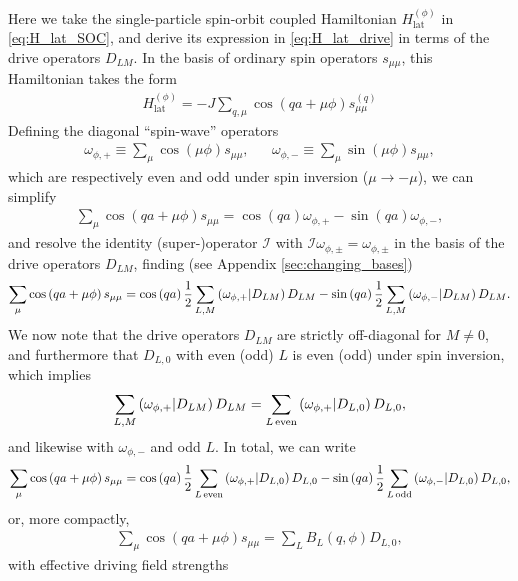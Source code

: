 \documentclass[nofootinbib,notitlepage,11pt]{revtex4-2}
\renewcommand{\t}{\text} %
\newcommand{\f}[2]{\dfrac{#1}{#2}} %
\newcommand{\p}[1]{\left(#1\right)} %
\newcommand{\1}{\mathds{1}}
\newcommand{\I}{\mathcal{I}}
\def\obk#1{\mathinner{({#1})}}
\begin{document}
Here we take the single-particle spin-orbit coupled Hamiltonian
$H_{\t{lat}}^{(\phi)}$ in \eqref{eq:H_lat_SOC}, and derive its
expression in \eqref{eq:H_lat_drive} in terms of the drive operators
$D_{LM}$.  In the basis of ordinary spin operators $s_{\mu\mu}$, this
Hamiltonian takes the form
\begin{align}
  H_{\t{lat}}^{(\phi)}
  = -J \sum_{q,\mu} \cos\p{qa+\mu\phi} s_{\mu\mu}^{(q)}
  \label{eq:H_lat_spin}
\end{align}
Defining the diagonal ``spin-wave'' operators
\begin{align}
  \omega_{\phi,+} \equiv \sum_\mu \cos\p{\mu\phi} s_{\mu\mu},
  &&
  \omega_{\phi,-} \equiv \sum_\mu \sin\p{\mu\phi} s_{\mu\mu},
\end{align}
which are respectively even and odd under spin inversion
($\mu\to-\mu$), we can simplify
\begin{align}
  \sum_\mu \cos\p{qa+\mu\phi} s_{\mu\mu}
  = \cos\p{qa} \omega_{\phi,+} - \sin\p{qa} \omega_{\phi,-},
\end{align}
and resolve the identity (super-)operator $\I$ with
$\I \omega_{\phi,\pm} = \omega_{\phi,\pm}$ in the basis of the drive
operators $D_{LM}$, finding (see Appendix \ref{sec:changing_bases})
\begin{align}
  \sum_\mu \cos\p{qa+\mu\phi} s_{\mu\mu}
  = \cos\p{qa} \f12 \sum_{L,M} \obk{\omega_{\phi,+}|D_{LM}} D_{LM}
  - \sin\p{qa} \f12 \sum_{L,M} \obk{\omega_{\phi,-}|D_{LM}} D_{LM}.
\end{align}
We now note that the drive operators $D_{LM}$ are strictly
off-diagonal for $M\ne0$, and furthermore that $D_{L,0}$ with even
(odd) $L$ is even (odd) under spin inversion, which implies
\begin{align}
  \sum_{L,M} \obk{\omega_{\phi,+}|D_{LM}} D_{LM}
  = \sum_{L\,\t{even}} \obk{\omega_{\phi,+}|D_{L,0}} D_{L,0},
\end{align}
and likewise with $\omega_{\phi,-}$ and odd $L$.  In total, we can
write
\begin{align}
  \sum_\mu \cos\p{qa+\mu\phi} s_{\mu\mu}
  = \cos\p{qa} \f12 \sum_{L\,\t{even}}
  \obk{\omega_{\phi,+}|D_{L,0}} D_{L,0}
  - \sin\p{qa} \f12 \sum_{L\,\t{odd}}
  \obk{\omega_{\phi,-}|D_{L,0}} D_{L,0},
\end{align}
or, more compactly,
\begin{align}
  \sum_\mu \cos\p{qa+\mu\phi} s_{\mu\mu}
  = \sum_L B_L\p{q,\phi} D_{L,0},
  \label{eq:compact_SOC_drive}
\end{align}
with effective driving field strengths
\end{document}
